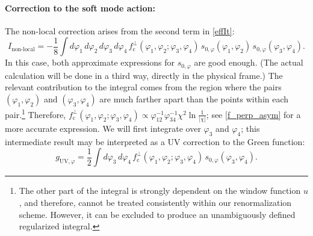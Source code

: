 \documentclass[12pt]{article}
\newcommand{\cc}{\mathrm{c}}
\newcommand{\nloc}{\text{non-local}}
\newcommand{\UV}{\text{UV}}
\newcommand{\vp}{\varphi}
\begin{document}
\paragraph{Correction to the soft mode action:}
The non-local correction arises from the second term in \eqref{effIt}:
\begin{equation}
I_{\nloc}=-\frac{1}{8}\int d\vp_1\,d\vp_2\,d\vp_3\,d\vp_4\,
f_{\cc}^{\perp}(\vp_1,\vp_2;\vp_3,\vp_4)\,
s_{0,\vp}(\vp_1,\vp_2)\,s_{0,\vp}(\vp_3,\vp_4).
\end{equation}
In this case, both approximate expressions for $s_{0,\vp}$ are good enough. (The actual calculation will be done in a third way, directly in the physical frame.) The relevant contribution to the integral comes from the region where the pairs $(\vp_1,\vp_2)$ and $(\vp_3,\vp_4)$ are much farther apart than the points within each pair.\footnote{The other part of the integral is strongly dependent on the window function $u$, and therefore, cannot be treated consistently within our renormalization scheme. However, it can be excluded to produce an unambiguously defined regularized integral.} Therefore, $f_{\cc}^{\perp}(\vp_1,\vp_2;\vp_3,\vp_4) \propto\vp_{12}^{-1}\vp_{34}^{-1}\chi^2\ln\frac{1}{|\chi|}$; see \eqref{f_perp_asym} for a more accurate expression. We will first integrate over $\vp_3$ and $\vp_4$; this intermediate result may be interpreted as a UV correction to the Green function:
\begin{equation}
g_{\UV,\vp}=\frac{1}{2}\int d\vp_3\,d\vp_4\,
f_{\cc}^{\perp}(\vp_1,\vp_2;\vp_3,\vp_4)\,
s_{0,\vp}(\vp_3,\vp_4).
\end{equation}
\end{document}
